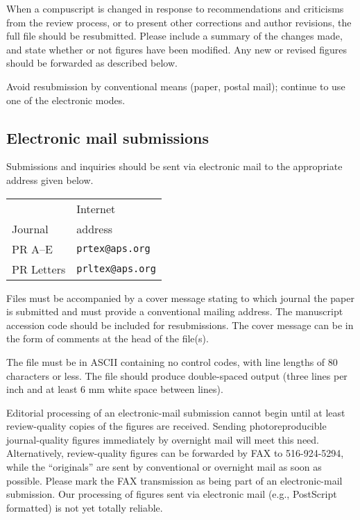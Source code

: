 When a compuscript is changed in response to recommendations and criticisms
from the review process, or to present other corrections and author
revisions, the full file should be resubmitted. Please include a summary of
the changes made, and state whether or not figures have been modified. Any
new or revised figures should be forwarded as described below.

Avoid resubmission by conventional means (paper, postal mail); continue to
use one of the electronic modes.


\subsection{Electronic mail submissions}

Submissions and inquiries should be sent via electronic mail to the
appropriate address given below.
\begin{quasitable}
\begin{tabular}{@{\hspace{.5in}}ll@{\hspace{.5in}}}
        & Internet \\
Journal & address \\
\hline
PR A--E & \verb+prtex@aps.org+ \\
PR Letters & \verb+prltex@aps.org+
\end{tabular}
\end{quasitable}
Files must be accompanied by a cover message stating to which journal the
paper is submitted and must provide a conventional mailing address. The
manuscript accession code should be included for resubmissions. The cover
message can be in the form of comments at the head of the file(s).

The file must be in ASCII containing no control codes, with line lengths of
80 characters or less. The file should produce double-spaced output (three
lines per inch and at least 6 mm white space between lines).

Editorial processing of an electronic-mail submission cannot begin until at
least review-quality copies of the figures are received. Sending
photoreproducible journal-quality figures immediately by overnight mail
will meet this need. Alternatively, review-quality figures  can be
forwarded by FAX to 516-924-5294, while the ``originals'' are sent by
conventional or overnight mail as soon as possible. Please mark the FAX
transmission as being part of an electronic-mail submission. Our processing
of figures sent via electronic mail (e.g., PostScript formatted) is not yet
totally reliable.

